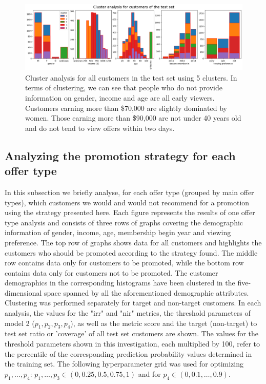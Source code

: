 \documentclass[11pt]{article} %
\begin{document}
\begin{figure}[H]
\includegraphics[width=1\textwidth]{results/results_test_set.png}
\caption{Cluster analysis for all customers in the test set using 5 clusters. In terms of clustering, we can see that people who do not provide information on gender, income and age are all early viewers. 
Customers earning more than \$70,000 are slightly dominated by women. Those earning more than \$90,000 are not under 40 years old and do not tend to view offers within two days.}
\end{figure}

\subsection{Analyzing the promotion strategy for each offer type}
In this subsection we briefly analyse, for each offer type (grouped by main offer types), which customers we would and would not recommend for a promotion using the strategy presented here.
Each figure represents the results of one offer type analysis and consists of three rows of graphs covering the demographic information of gender, income, age, membership begin year and viewing preference.
The top row of graphs shows data for all customers and highlights the customers who should be promoted according to the strategy found.
The middle row contains data only for customers to be promoted, while the bottom row contains data only for customers not to be promoted.
The customer demographics in the corresponding histograms have been clustered in the five-dimensional space spanned by all the aforementioned demographic attributes. Clustering was performed separately for target and non-target customers. In each analysis, the values for the "irr" and "nir" metrics, the threshold parameters of model 2 ($p_1, p_2, p_3, p_4$), as well as the metric score and the target (non-target) to test set ratio or 'coverage' of all test set customers are shown.
The values for the threshold parameters shown in this investigation, each multiplied by 100, refer to the percentile of the corresponding prediction probability values determined in the training set.
The following hyperparameter grid was used for optimizing $p_1,\dots, p_4$: $p_1,\dots, p_3 \in (0, 0.25, 0.5, 0.75, 1)$ and for $p_4 \in (0,0.1,\dots,0.9)$.
\end{document}
